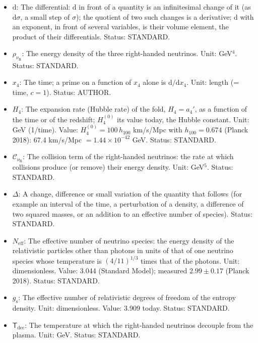 \documentclass[
  10pt,
]{article}
\providecommand{\tightlist}{%
  \setlength{\itemsep}{0pt}\setlength{\parskip}{0pt}}
\begin{document}
\begin{itemize}
\tightlist
\item
  \(\mathrm{d}\): The differential: \(\mathrm{d}\) in front of a
  quantity is an infinitesimal change of it (as \(\mathrm{d}\sigma\), a
  small step of \(\sigma\)); the quotient of two such changes is a
  derivative; \(\mathrm{d}\) with an exponent, in front of several
  variables, is their volume element, the product of their
  differentials. Status: STANDARD.
\item
  \(\rho_{\nu_{\mathrm{R}}}\): The energy density of the three
  right-handed neutrinos. Unit: GeV\(^4\). Status: STANDARD.
\item
  \(x_4\): The time; a prime on a function of \(x_4\) alone is
  \(\mathrm{d}/\mathrm{d}x_4\). Unit: length (= time, \(c = 1\)).
  Status: AUTHOR.
\item
  \(H_4\): The expansion rate (Hubble rate) of the fold, \(H_4 = a_4'\),
  as a function of the time or of the redshift; \(H_4^{(0)}\) its value
  today, the Hubble constant. Unit: GeV (1/time). Value:
  \(H_4^{(0)} = 100\,h_{100}\) km/s/Mpc with \(h_{100} = 0.674\) (Planck
  2018): 67.4 km/s/Mpc \(= 1.44\times10^{-42}\) GeV. Status: STANDARD.
\item
  \(\mathcal{C}_{\nu_{\mathrm{R}}}\): The collision term of the
  right-handed neutrinos: the rate at which collisions produce (or
  remove) their energy density. Unit: GeV\(^5\). Status: STANDARD.
\item
  \(\Delta\): A change, difference or small variation of the quantity
  that follows (for example an interval of the time, a perturbation of a
  density, a difference of two squared masses, or an addition to an
  effective number of species). Status: STANDARD.
\item
  \(N_{\mathrm{eff}}\): The effective number of neutrino species: the
  energy density of the relativistic particles other than photons in
  units of that of one neutrino species whose temperature is
  \((4/11)^{1/3}\) times that of the photons. Unit: dimensionless.
  Value: 3.044 (Standard Model); measured \(2.99 \pm 0.17\) (Planck
  2018). Status: STANDARD.
\item
  \(g_{\mathrm{s}}\): The effective number of relativistic degrees of
  freedom of the entropy density. Unit: dimensionless. Value: 3.909
  today. Status: STANDARD.
\item
  \(\mathsf{T}_{\mathrm{dec}}\): The temperature at which the
  right-handed neutrinos decouple from the plasma. Unit: GeV. Status:
  STANDARD.
\end{itemize}
\end{document}
